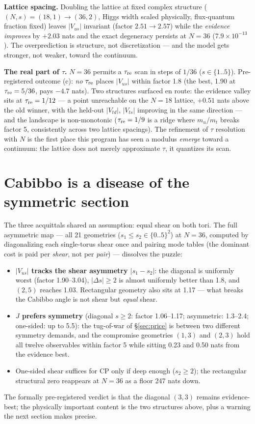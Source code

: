 \documentclass[aps,prd,preprint,nofootinbib]{revtex4-2}
\begin{document}
\textbf{Lattice spacing.} Doubling the lattice at fixed complex structure
($(N,s)=(18,1)\to(36,2)$, Higgs width scaled physically, flux-quantum fraction
fixed) leaves $|V_{us}|$ invariant (factor $2.51\to 2.57$) while the
\emph{evidence improves} by $+2.03$ nats and the exact degeneracy persists at
$N=36$ ($7.9\times 10^{-13}$). The overprediction is structure, not
discretization --- and the model gets stronger, not weaker, toward the
continuum.

\textbf{The real part of $\tau$.} $N=36$ permits a $\tau_{\rm re}$ scan in
steps of $1/36$ ($s\in\{1..5\}$). Pre-registered outcome (c): \emph{no}
$\tau_{\rm re}$ places $|V_{us}|$ within factor 1.8 (the best, 1.90 at
$\tau_{\rm re}=5/36$, pays $-4.7$ nats). Two structures surfaced en route: the
evidence valley sits at $\tau_{\rm re}=1/12$ --- a point unreachable on the
$N=18$ lattice, $+0.51$ nats above the old winner, with the held-out
$|V_{td}|$, $|V_{ts}|$ improving in the same direction --- and the landscape is
non-monotonic ($\tau_{\rm re}=1/9$ is a ridge where $m_u/m_t$ breaks factor 5,
consistently across two lattice spacings). The refinement of $\tau$ resolution
with $N$ is the first place this program has seen a modulus \emph{emerge}
toward a continuum: the lattice does not merely approximate $\tau$, it
quantizes its scan.

\section{Cabibbo is a disease of the symmetric section}
\label{sec:map}

The three acquittals shared an assumption: equal shear on both tori. The full
asymmetric map --- all 21 geometries ($s_1\le s_2\in\{0..5\}^2$) at $N=36$,
computed by diagonalizing each single-torus shear once and pairing mode tables
(the dominant cost is paid per \emph{shear}, not per \emph{pair}) --- dissolves
the puzzle:
\begin{itemize}
\item \textbf{$|V_{us}|$ tracks the shear asymmetry $|s_1-s_2|$}: the diagonal
      is uniformly worst (factor 1.90--3.04), $|\Delta s|\ge 2$ is almost
      uniformly better than 1.8, and $(2,5)$ reaches 1.03. Rectangular geometry
      also sits at 1.17 --- what breaks the Cabibbo angle is not shear but
      \emph{equal} shear.
\item \textbf{$J$ prefers symmetry} (diagonal $s\ge 2$: factor 1.06--1.17;
      asymmetric: 1.3--2.4; one-sided: up to 5.5): the tug-of-war of
      \S\ref{sec:price} is between two different symmetry demands, and the
      compromise geometries $(1,3)$ and $(2,3)$ hold all twelve observables
      within factor 5 while sitting 0.23 and 0.50 nats from the evidence best.
\item One-sided shear suffices for CP only if deep enough ($s_2\ge 2$); the
      rectangular structural zero reappears at $N=36$ as a floor 247 nats down.
\end{itemize}
The formally pre-registered verdict is that the diagonal $(3,3)$ remains
evidence-best; the physically important content is the two structures above,
plus a warning the next section makes precise.
\end{document}
